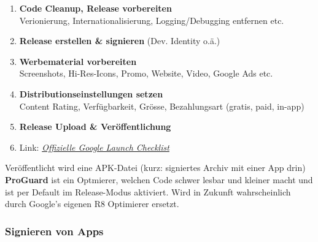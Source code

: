 \documentclass[a4paper]{article}
\begin{document}
	\begin{enumerate}
		\item \textbf{Code Cleanup, Release vorbereiten}\\
				Verionierung, Internationalisierung, Logging/Debugging entfernen etc.
				
		\item \textbf{Release erstellen \& signieren} (Dev. Identity o.ä.)
		
		\item \textbf{Werbematerial vorbereiten}\\
				Screenshots, Hi-Res-Icons, Promo, Website, Video, Google Ads etc.
				
		\item \textbf{Distributionseinstellungen setzen}\\
				Content Rating, Verfügbarkeit, Grösse, Bezahlungsart (gratis, paid, in-app)
				
		\item \textbf{Release Upload \& Veröffentlichung}\\
		
		\item Link: \href{https://developer.android.com/distribute/best-practices/launch/launch-checklist.html}
		{\textit{Offizielle Google Launch Checklist}}\\
		
	\end{enumerate}
	\noindent
	Veröffentlicht wird eine APK-Datei (kurz: signiertes Archiv mit einer App drin)\\
	\textbf{ProGuard} ist ein Optmierer, welchen Code schwer lesbar und kleiner macht und ist per Default im Release-Modus aktiviert. Wird in Zukunft wahrscheinlich durch Google's eigenen R8 Optimierer ersetzt.
	
		\subsubsection{Signieren von Apps}
		
\end{document}
